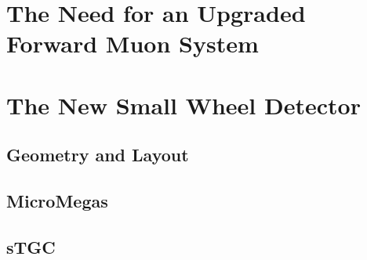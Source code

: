 
\section{The Need for an Upgraded Forward Muon System}

\section{The New Small Wheel Detector}
\subsection{Geometry and Layout}
\subsection{MicroMegas}
\subsection{sTGC}
